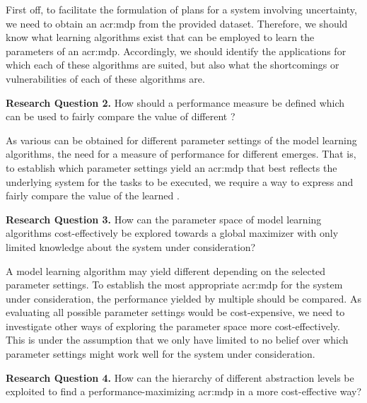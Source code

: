 First off, to facilitate the formulation of plans for a system involving uncertainty, we need to obtain an \acrshort{acr:mdp} from the provided dataset.
Therefore, we should know what learning algorithms exist that can be employed to learn the parameters of an \acrshort{acr:mdp}.
Accordingly, we should identify the applications for which each of these algorithms are suited, but also what the shortcomings or vulnerabilities of each of these algorithms are.

\vspace{16pt}
\noindent%
\textbf{Research Question 2.} How should a performance measure be defined which can be used to fairly compare the value of different ?
\vspace{12pt}

As various  can be obtained for different parameter settings of the model learning algorithms, the need for a measure of performance for different  emerges.
That is, to establish which parameter settings yield an \acrshort{acr:mdp} that best reflects the underlying system for the tasks to be executed, we require a way to express and fairly compare the value of the learned .

\vspace{16pt}
\noindent%
\textbf{Research Question 3.} How can the parameter space of model learning algorithms cost-effectively be explored towards a global maximizer with only limited knowledge about the system under consideration?
\vspace{12pt}

A model learning algorithm may yield different  depending on the selected parameter settings.
To establish the most appropriate \acrshort{acr:mdp} for the system under consideration, the performance yielded by multiple  should be compared.
As evaluating all possible parameter settings would be cost-expensive, we need to investigate other ways of exploring the parameter space more cost-effectively.
This is under the assumption that we only have limited to no belief over which parameter settings might work well for the system under consideration.

\vspace{16pt}
\noindent%
\textbf{Research Question 4.} How can the hierarchy of different abstraction levels be exploited to find a performance-maximizing \acrshort{acr:mdp} in a more cost-effective way?
\vspace{12pt}

